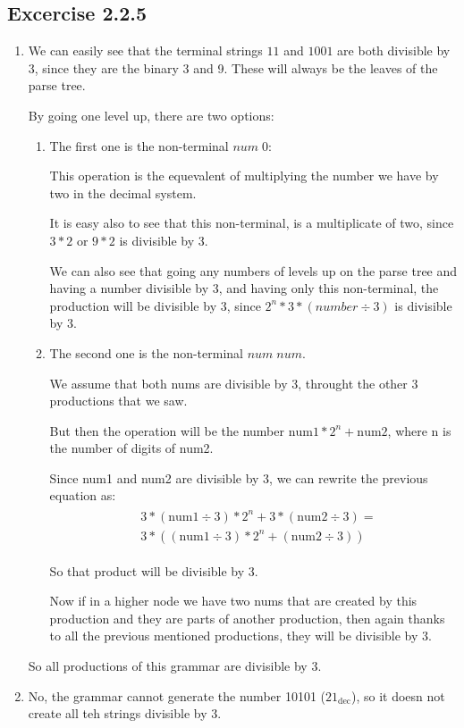 \documentclass{article}
\begin{document}
\subsection*{Excercise 2.2.5}
\begin{enumerate}[label=\alph*)]
\item
We can easily see that the terminal strings $11$ and $1001$ are both divisible by 3, since they are the binary 3 and 9. These will always be the leaves of the parse tree.

By going one level up, there are two options: 
\begin{enumerate}[label=\arabic*)]
\item The first one is the non-terminal $\textit{num}\; 0$:

This operation is the equevalent of multiplying the number we have by two in the decimal system.

It is easy also to see that this non-terminal, is a multiplicate of two, since $3*2$ or $9*2$ is divisible by 3. 

We can also see that going any numbers of levels up on the parse tree and having a number divisible by 3, and having only this non-terminal, the production will be divisible by 3, since $2^{n} * 3 * (\textit{number} \div 3)$ is divisible by 3.

\item The second one is the non-terminal $\textit{num} \; \textit{num}$.

We assume that both nums are divisible by 3, throught the other 3 productions that we saw.

But then the operation will be the number $\text{num}1 * 2^{n} + \text{num}2$, where n is the number of digits of num2.

Since num1 and num2 are divisible by 3, we can rewrite the previous equation as:
\begin{gather*}
    \begin{align*}
        &3* (\text{num}1 \div 3)*2^{n} + 3*(\text{num}2 \div 3) =\\
        &3 * ((\text{num}1 \div 3)*2^{n} + (\text{num}2 \div 3))
\end{align*}
\end{gather*}

So that product will be divisible by 3.

Now if in a higher node we have two nums that are created by this production and they are parts of another production, then again thanks to all the previous mentioned productions, they will be divisible by 3.
\end{enumerate}
So all productions of this grammar are divisible by 3.

\item No, the grammar cannot generate the number 10101 ($21_{\text{dec}}$), so it doesn not create all teh strings divisible by 3.
\end{enumerate}
\end{document}
